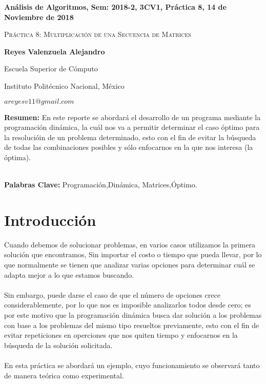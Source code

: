 \documentclass[12pt,twoside]{article}
\date{}
\begin{document}
\centerline{\bf An\'alisis de Algoritmos, Sem: 2018-2, 3CV1, Pr\'actica 8, 14 de Noviembre de 2018}
\centerline{}
\centerline{}
\begin{center}
\Large{\textsc{Pr\'actica 8:  Multiplicaci\'on de una Secuencia de Matrices}}
\end{center}
\centerline{}
\centerline{\bf {Reyes Valenzuela Alejandro}}
\centerline{}
\centerline{Escuela Superior de C\'omputo}
\centerline{Instituto Polit\'ecnico Nacional, M\'exico}
\centerline{$areyesv11@gmail.com$}
\newtheorem{Theorem}{\quad Theorem}[section]
\newtheorem{Definition}[Theorem]{\quad Definition}
\newtheorem{Corollary}[Theorem]{\quad Corollary}
\newtheorem{Lemma}[Theorem]{\quad Lemma}
\newtheorem{Example}[Theorem]{\quad Example}
\bigskip
\textbf{Resumen:} En este reporte se abordar\'a el desarrollo de un programa mediante la programaci\'on din\'amica, la cu\'al nos va a permitir determinar el caso \'optimo para la resoluci\'oin de un problema determinado, esto con el fin de evitar la b\'usqueda de  todas las combinaciones posibles y s\'olo enfocarnos en la que nos interesa (la \'optima).\\\\
\centerline{{\bf Palabras Clave:} Programaci\'on,Din\'amica, Matrices,\'Optimo.}
\section{Introducci\'on}
Cuando debemos de solucionar problemas, en varios casos utilizamos la primera soluci\'on que encontramos, Sin importar el costo o tiempo que pueda llevar, por lo que normalmente se tienen que analizar varias opciones para determinar cu\'al se adapta mejor a lo que estamos buscando. \\\\
Sin embargo, puede darse el caso de que el n\'umero de opciones crece considerablemente, por lo que nos es imposible analizarlos todos desde cero; es por este motivo que la programaci\'on din\'amica busca dar soluci\'on a los problemas con base a los problemas del mismo tipo resueltos previamente, esto con el fin de evitar repeticiones en operciones que nos quiten tiempo y enfocarnos en la b\'usqueda de la soluci\'on solicitada.\\\\ 
En esta pr\'actica se abordar\'a un ejemplo, cuyo funcionamiento se observar\'a tanto de manera te\'orica como experimental.
\end{document}
